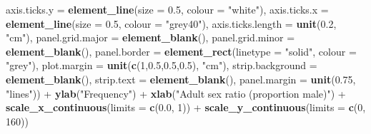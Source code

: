 \documentclass[]{article}
\newenvironment{Shaded}{\begin{snugshade}}{\end{snugshade}}
\newcommand{\KeywordTok}[1]{\textcolor[rgb]{0.13,0.29,0.53}{\textbf{{#1}}}}
\newcommand{\DataTypeTok}[1]{\textcolor[rgb]{0.13,0.29,0.53}{{#1}}}
\newcommand{\DecValTok}[1]{\textcolor[rgb]{0.00,0.00,0.81}{{#1}}}
\newcommand{\FloatTok}[1]{\textcolor[rgb]{0.00,0.00,0.81}{{#1}}}
\newcommand{\StringTok}[1]{\textcolor[rgb]{0.31,0.60,0.02}{{#1}}}
\newcommand{\NormalTok}[1]{{#1}}
\begin{document}
\begin{Shaded}
\begin{Highlighting}[]
                \DataTypeTok{axis.ticks.y =} \KeywordTok{element_line}\NormalTok{(}\DataTypeTok{size =} \FloatTok{0.5}\NormalTok{, }\DataTypeTok{colour =} \StringTok{"white"}\NormalTok{),}
                \DataTypeTok{axis.ticks.x =} \KeywordTok{element_line}\NormalTok{(}\DataTypeTok{size =} \FloatTok{0.5}\NormalTok{, }\DataTypeTok{colour =} \StringTok{"grey40"}\NormalTok{),}
                \DataTypeTok{axis.ticks.length =} \KeywordTok{unit}\NormalTok{(}\FloatTok{0.2}\NormalTok{, }\StringTok{"cm"}\NormalTok{),}
                \DataTypeTok{panel.grid.major =} \KeywordTok{element_blank}\NormalTok{(),}
                \DataTypeTok{panel.grid.minor =} \KeywordTok{element_blank}\NormalTok{(),}
                \DataTypeTok{panel.border =} \KeywordTok{element_rect}\NormalTok{(}\DataTypeTok{linetype =} \StringTok{"solid"}\NormalTok{, }\DataTypeTok{colour =} \StringTok{"grey"}\NormalTok{),}
                \DataTypeTok{plot.margin =} \KeywordTok{unit}\NormalTok{(}\KeywordTok{c}\NormalTok{(}\DecValTok{1}\NormalTok{,}\FloatTok{0.5}\NormalTok{,}\FloatTok{0.5}\NormalTok{,}\FloatTok{0.5}\NormalTok{), }\StringTok{"cm"}\NormalTok{),}
                \DataTypeTok{strip.background =} \KeywordTok{element_blank}\NormalTok{(), }
                \DataTypeTok{strip.text =} \KeywordTok{element_blank}\NormalTok{(),}
                \DataTypeTok{panel.margin =} \KeywordTok{unit}\NormalTok{(}\FloatTok{0.75}\NormalTok{, }\StringTok{"lines"}\NormalTok{)) +}
\StringTok{          }\KeywordTok{ylab}\NormalTok{(}\StringTok{"Frequency"}\NormalTok{) +}
\StringTok{          }\KeywordTok{xlab}\NormalTok{(}\StringTok{"Adult sex ratio (proportion male)"}\NormalTok{) +}
\StringTok{          }\KeywordTok{scale_x_continuous}\NormalTok{(}\DataTypeTok{limits =} \KeywordTok{c}\NormalTok{(}\FloatTok{0.0}\NormalTok{, }\DecValTok{1}\NormalTok{)) +}
\StringTok{          }\KeywordTok{scale_y_continuous}\NormalTok{(}\DataTypeTok{limits =} \KeywordTok{c}\NormalTok{(}\DecValTok{0}\NormalTok{, }\DecValTok{160}\NormalTok{))}
\end{Highlighting}
\end{Shaded}
\end{document}
